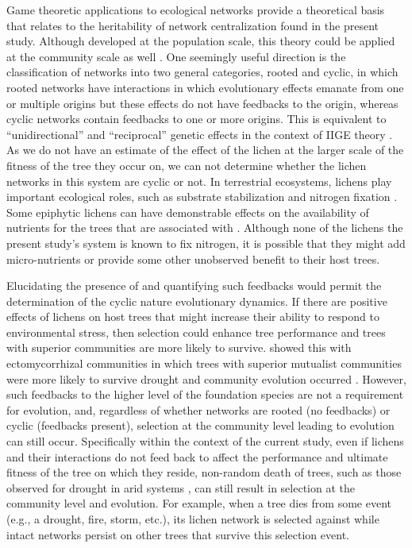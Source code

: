\documentclass[fleqn,12pt]{olplainarticle}
\begin{document}
Game theoretic applications to ecological networks provide a
theoretical basis that relates to the heritability of network
centralization found in the present study. Although developed at the
population scale, this theory could be applied at the community scale
as well \citep{Lieberman2005EvolutionaryGraphs}. One seemingly useful
direction is the classification of networks into two general
categories, rooted and cyclic, in which rooted networks have
interactions in which evolutionary effects emanate from one or
multiple origins but these effects do not have feedbacks to the
origin, whereas cyclic networks contain feedbacks to one or more
origins. This is equivalent to ``unidirectional'' and ``reciprocal''
genetic effects in the context of IIGE theory
\citep{Whitham2020IntraspecificEvolution}. As we do not have an
estimate of the effect of the lichen at the larger scale of the
fitness of the tree they occur on, we can not determine whether the
lichen networks in this system are cyclic or not. In terrestrial
ecosystems, lichens play important ecological roles, such as substrate
stabilization \citep{Root2011BioticWashington} and nitrogen fixation
\citep{Nelson2018LichenHelens}. Some epiphytic lichens can have
demonstrable effects on the availability of nutrients for the trees
that are associated with \citep{Norby1989NitrogenDioxide}.  Although
none of the lichens the present study's system is known to fix
nitrogen, it is possible that they might add micro-nutrients or
provide some other unobserved benefit to their host trees.

Elucidating the presence of and quantifying such feedbacks would
permit the determination of the cyclic nature evolutionary
dynamics. If there are positive effects of lichens on host trees that
might increase their ability to respond to environmental stress, then
selection could enhance tree performance and trees with superior
communities are more likely to survive.  \cite{Gehring2014PlantChange,
  Gehring2017a} showed this with ectomycorrhizal communities in which
trees with superior mutualist communities were more likely to survive
drought and community evolution occurred
\citep{Whitham2020IntraspecificEvolution}.  However, such feedbacks to
the higher level of the foundation species are not a requirement for
evolution, and, regardless of whether networks are rooted (no
feedbacks) or cyclic (feedbacks present), selection at the community
level leading to evolution can still occur.  Specifically within the
context of the current study, even if lichens and their interactions
do not feed back to affect the performance and ultimate fitness of the
tree on which they reside, non-random death of trees, such as those
observed for drought in arid systems \cite{Sthultz2009, Gehring2017a},
can still result in selection at the community level and
evolution. For example, when a tree dies from some event (e.g., a
drought, fire, storm, etc.), its lichen network is selected against
while intact networks persist on other trees that survive this
selection event.
\end{document}
